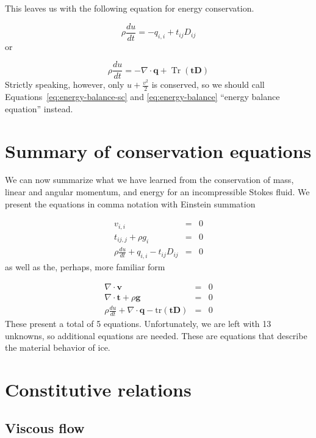 \documentclass[12pt, openany]{memoir}
\DeclareMathOperator{\Tr}{Tr}
\begin{document}
This leaves us with the following equation for energy conservation. 

\begin{equation} \label{eq:energy-balance-sc}
\rho \frac{du}{dt} = - q_{i,i} + t_{ij}D_{ij}
\end{equation}
or

\begin{equation} \label{eq:energy-balance}
\rho \frac{du}{dt} = - \nabla \cdot \mathbf{q} + \Tr (\mathbf{tD})
\end{equation}
Strictly speaking, however, only $u + \frac{v^2}{2}$ is conserved, so
we should call Equations~\eqref{eq:energy-balance-sc} and
\eqref{eq:energy-balance} ``energy balance equation'' instead.


\section{Summary of conservation equations}

We can now summarize what we have learned from the conservation of
mass, linear and angular momentum, and energy for an incompressible
Stokes fluid. We present the equations in comma notation with Einstein
summation

\begin{eqnarray}
v_{i,i} &=& 0 \\
t_{ij,j} + \rho g_i &=& 0 \\
\rho \frac{du}{dt} + q_{i,i} - t_{ij}D_{ij} &=& 0
\end{eqnarray}
as well as the, perhaps, more familiar form

\begin{eqnarray}
\nabla \cdot \mathbf{v} &=& 0 \\
\nabla \cdot \mathbf{t} + \rho \mathbf{g} &=& 0 \\
\rho \frac{du}{dt} + \nabla \cdot \mathbf{q} - \mathrm{tr}
(\mathbf{t}\mathbf{D})  &=& 0
\end{eqnarray}
These present a total of 5 equations. Unfortunately, we are left with
13 unknowns, so additional equations are needed. These are equations
that describe the material behavior of ice.

\section{Constitutive relations}

\subsection{Viscous flow}
\end{document}
